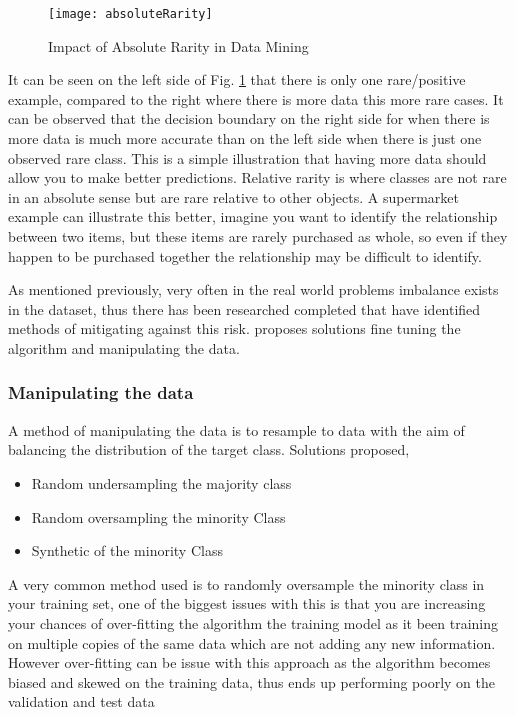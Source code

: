 \begin{figure}[H]
	\texttt{[image: absoluteRarity]}
	\caption{
		Impact of Absolute Rarity in Data Mining \\ \cite[Source:][]{weiss_mining_2004}
	}
	\label{fig:absoluteRarity}
\end{figure}

It can be seen on the left side of Fig. \ref{fig:absoluteRarity} that there is only one rare/positive example, compared to the right where there is more data this more rare cases. It can be observed that the decision boundary on the right side for when there is more data is much more accurate than on the left side when there is just one observed rare class. This is a simple illustration that having more data should allow you to make better predictions. Relative rarity is where classes are not rare in an absolute sense but are rare relative to other objects. A supermarket example can illustrate this better, imagine you want to identify the relationship between two items, but these items are rarely purchased as whole, so even if they happen to be purchased together the relationship may be difficult to identify.

As mentioned previously, very often in the real world problems imbalance exists in the dataset, thus there has been researched completed that have identified methods of mitigating against this risk. \citep{chawla_editorial:_2004} proposes solutions fine tuning the algorithm and manipulating the data. 

\subsubsection{Manipulating the data}

A method of manipulating the data is to resample to data with the aim of balancing the distribution of the target class. Solutions proposed,

\begin{itemize}
	\item Random undersampling the majority class
	\item Random oversampling the minority Class
	\item Synthetic of the minority Class 
\end{itemize}

A very common method used is to randomly oversample the minority class in your training set, one of the biggest issues with this is that you are increasing your chances of over-fitting the algorithm the training model as it been training on multiple copies of the same data which are not adding any new information. However over-fitting can be issue with this approach as the algorithm becomes biased and skewed on the training data, thus ends up performing poorly on the validation and test data \cite[see][]{hawkins_problem_2004}

